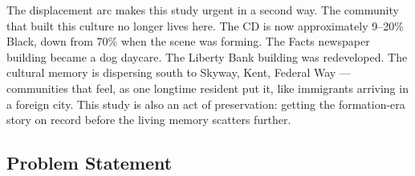 \documentclass[11pt,letterpaper]{article}
\begin{document}
The displacement arc makes this study urgent in a second way. The community that built this culture no longer lives here. The CD is now approximately 9--20\% Black, down from 70\% when the scene was forming. The Facts newspaper building became a dog daycare. The Liberty Bank building was redeveloped. The cultural memory is dispersing south to Skyway, Kent, Federal Way --- communities that feel, as one longtime resident put it, like immigrants arriving in a foreign city. This study is also an act of preservation: getting the formation-era story on record before the living memory scatters further.

\subsection{Problem Statement}
\end{document}
